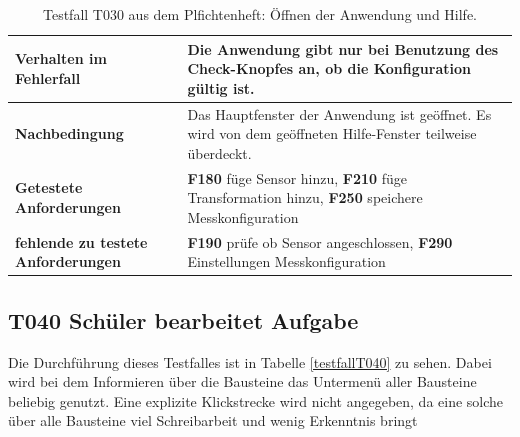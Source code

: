 \documentclass[parskip=full]{scrartcl}
\begin{document}
\begin{table}[h]
\begin{tabular}{| p{4cm} | p{10cm} |}
	\textbf{Verhalten im Fehlerfall}
	& 
	Die Anwendung gibt nur bei Benutzung des Check-Knopfes an, ob die Konfiguration gültig ist.
	\\ \hline
	
	\textbf{Nachbedingung}
	& 
	Das Hauptfenster der Anwendung ist geöffnet. Es wird von dem geöffneten Hilfe-Fenster teilweise überdeckt.
	\\ \hline
	
	
	\textbf{Getestete Anforderungen}
	& 
	\textbf{F180} füge Sensor hinzu, \textbf{F210} füge Transformation hinzu, \textbf{F250} speichere Messkonfiguration
	\\ \hline
	\textbf{fehlende zu testete Anforderungen}
	& 
	\textbf{F190} prüfe ob Sensor angeschlossen, \textbf{F290} Einstellungen Messkonfiguration 
	\\ \hline
	
	
\end{tabular}
\caption{Testfall T030 aus dem Plfichtenheft: Öffnen der Anwendung und Hilfe.}
\label{testfallT030}
\end{table}



\subsection{\textbf{T040} Schüler bearbeitet Aufgabe}

Die Durchführung dieses Testfalles ist in Tabelle \ref{testfallT040} zu sehen. Dabei wird bei dem Informieren über die Bausteine das Untermenü aller Bausteine beliebig genutzt. Eine explizite Klickstrecke wird nicht angegeben, da eine solche über alle Bausteine viel Schreibarbeit und wenig Erkenntnis bringt
\end{document}
